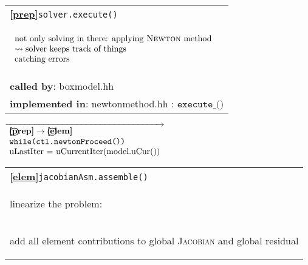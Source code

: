\begin{landscape}
{%
    \begin{tabular}{|l|}
      \hline
            \textbf{\textcircled{\ref{prep}}}\verb+solver.execute()+ \\
            \begin{scriptsize}$\begin{array}{l}
      \textnormal{not only solving in there: applying \textsc{Newton} method} \\
      \rightsquigarrow\textnormal{solver keeps track of things}\\
      \textnormal{catching errors}
      \end{array}$\end{scriptsize}\\
      \textbf{called by}: boxmodel.hh\\
      \textbf{implemented in}: newtonmethod.hh : $\texttt{execute\_()}$\\  
    \hline
  \end{tabular}
\nextline
 $\overrightarrow{ \begin{array}{l}
				  \textbf{\textcircled{\ref{prep}}} \rightarrow \textbf{\textcircled{\ref{elem}}}\\
                                  \texttt{while(ctl.newtonProceed())}\\
				  \textnormal{uLastIter = uCurrentIter(model.uCur())} 
                                 \end{array}
    }$
    \begin{tabular}{|l|}
      \hline      
	\textbf{\textcircled{\ref{elem}}}\verb+jacobianAsm.assemble()+ \\
    \begin{scriptsize}linearize the problem:  \end{scriptsize}\\
    \begin{scriptsize}add all element contributions to global \textsc{Jacobian} and global residual\end{scriptsize}\\

\end{tabular}}
\end{landscape}

